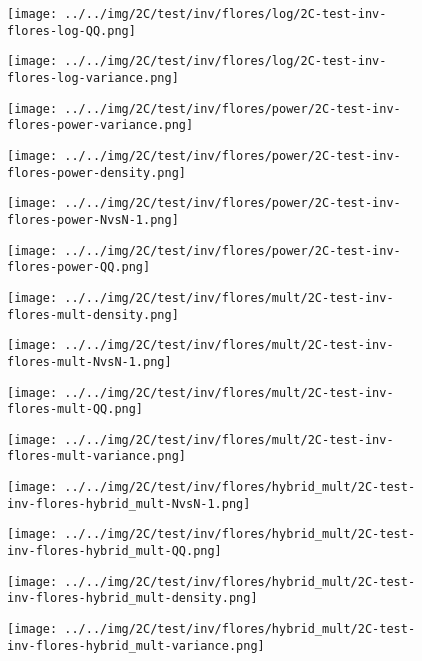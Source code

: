 \begin{figure}[H]
\centering	\texttt{[image: ../../img/2C/test/inv/flores/log/2C-test-inv-flores-log-QQ.png]}
\end{figure}
\begin{figure}[H]
\centering	\texttt{[image: ../../img/2C/test/inv/flores/log/2C-test-inv-flores-log-variance.png]}
\end{figure}
\begin{figure}[H]
\centering	\texttt{[image: ../../img/2C/test/inv/flores/power/2C-test-inv-flores-power-variance.png]}
\end{figure}
\begin{figure}[H]
\centering	\texttt{[image: ../../img/2C/test/inv/flores/power/2C-test-inv-flores-power-density.png]}
\end{figure}
\begin{figure}[H]
\centering	\texttt{[image: ../../img/2C/test/inv/flores/power/2C-test-inv-flores-power-NvsN-1.png]}
\end{figure}
\begin{figure}[H]
\centering	\texttt{[image: ../../img/2C/test/inv/flores/power/2C-test-inv-flores-power-QQ.png]}
\end{figure}
\begin{figure}[H]
\centering	\texttt{[image: ../../img/2C/test/inv/flores/mult/2C-test-inv-flores-mult-density.png]}
\end{figure}
\begin{figure}[H]
\centering	\texttt{[image: ../../img/2C/test/inv/flores/mult/2C-test-inv-flores-mult-NvsN-1.png]}
\end{figure}
\begin{figure}[H]
\centering	\texttt{[image: ../../img/2C/test/inv/flores/mult/2C-test-inv-flores-mult-QQ.png]}
\end{figure}
\begin{figure}[H]
\centering	\texttt{[image: ../../img/2C/test/inv/flores/mult/2C-test-inv-flores-mult-variance.png]}
\end{figure}
\begin{figure}[H]
\centering	\texttt{[image: ../../img/2C/test/inv/flores/hybrid\_mult/2C-test-inv-flores-hybrid\_mult-NvsN-1.png]}
\end{figure}
\begin{figure}[H]
\centering	\texttt{[image: ../../img/2C/test/inv/flores/hybrid\_mult/2C-test-inv-flores-hybrid\_mult-QQ.png]}
\end{figure}
\begin{figure}[H]
\centering	\texttt{[image: ../../img/2C/test/inv/flores/hybrid\_mult/2C-test-inv-flores-hybrid\_mult-density.png]}
\end{figure}
\begin{figure}[H]
\centering	\texttt{[image: ../../img/2C/test/inv/flores/hybrid\_mult/2C-test-inv-flores-hybrid\_mult-variance.png]}
\end{figure}
